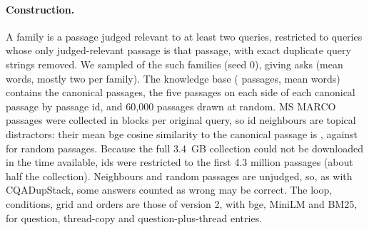 \documentclass[11pt]{article}
\begin{document}
\paragraph{Construction.} A family is a passage judged relevant to at least two queries, restricted to queries whose only judged-relevant passage is that passage, with exact duplicate query strings removed. We sampled \hFam{} of the \hFamAvail{} such families (seed 0), giving \hAsks{} asks (mean \hAskWords{} words, mostly two per family). The knowledge base (\hKB{} passages, mean \hKBWords{} words) contains the canonical passages, the five passages on each side of each canonical passage by passage id, and 60{,}000 passages drawn at random. MS MARCO passages were collected in blocks per original query, so id neighbours are topical distractors: their mean bge cosine similarity to the canonical passage is \hNbCos, against \hBgCos{} for random passages. Because the full 3.4~GB collection could not be downloaded in the time available, ids were restricted to the first 4.3 million passages (about half the collection). Neighbours and random passages are unjudged, so, as with CQADupStack, some answers counted as wrong may be correct. The loop, conditions, grid and orders are those of version 2, with bge, MiniLM and BM25, for question, thread-copy and question-plus-thread entries.

\begin{table}[t]\centering\scriptsize
\resizebox{\linewidth}{!}{}
\caption{MS MARCO families: no-write-back top-1 accuracy (\%), paired change in top-1 accuracy (points, 95\% interval over ten orders) under naive write-back, crossover with 95\% bootstrap interval, and share of top-1 answers from written-back entries in the second half of the stream at $p_w=0.95$.}
\label{tab:het}
\end{table}
\end{document}
